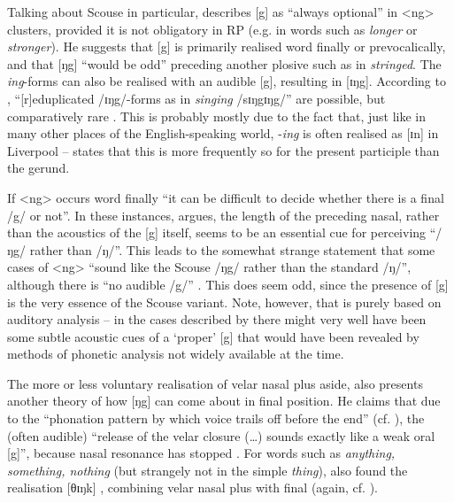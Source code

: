 Talking about Scouse in particular, \textcite[293]{knowles1973} describes [g] as ``always optional'' in <ng> clusters, provided it is not obligatory in RP (e.g. in words such as \emph{longer} or \emph{stronger}).
He suggests that [g] is primarily realised word finally or prevocalically, and that [ŋg] ``would be odd'' \parencite[293]{knowles1973} preceding another plosive such as in \emph{stringed}.
The \emph{ing}-forms can also be realised with an audible [g], resulting in [ɪŋg].
According to \textcite[293]{knowles1973}, ``[r]eduplicated /ɪŋg/-forms as in \emph{singing} /sɪŋgɪŋg/'' are possible, but comparatively rare \citep[cf.][293]{knowles1973}.
This is probably mostly due to the fact that, just like in many other places of the English-speaking world, -\emph{ing} is often realised as [ɪn] in Liverpool -- \textcite[cf.][156]{knowles1973} states that this is more frequently so for the present participle than the gerund.

If <ng> occurs word finally ``it can be difficult to decide whether there is a final /g/ or not''.
In these instances, \citeauthor{knowles1973} argues, the length of the preceding nasal, rather than the acoustics of the [g] itself, seems to be an essential cue for perceiving ``/ŋg/ rather than /ŋ/''.
This leads \citeauthor{knowles1973} to the somewhat strange statement that some cases of <ng> ``sound like the Scouse /ŋg/ rather than the standard /ŋ/'', although there is ``no audible /g/'' \citep[293]{knowles1973}.
This does seem odd, since the presence of [g] is the very essence of the Scouse variant.
Note, however, that \citealt{knowles1973} is purely based on auditory analysis -- in the cases described by \citeauthor{knowles1973} there might very well have been some subtle acoustic cues of a `proper' [g] that would have been revealed by methods of phonetic analysis not widely available at the time.

The more or less voluntary realisation of velar nasal plus aside, \cite{knowles1973} also presents another theory of how [ŋg] can come about in final position.
He claims that due to the ``phonation pattern by which voice trails off before the end'' (cf. ), the (often audible) ``release of the velar closure (\ldots) sounds exactly like a weak oral [g]'', because nasal resonance has stopped \citep[cf.][294]{knowles1973}.
For words such as \emph{anything, something, nothing} (but strangely not in the simple \emph{thing}), \textcite[cf.][156]{knowles1973} also found the realisation [θɪŋk] , combining velar nasal plus with final  (again, cf. ).

